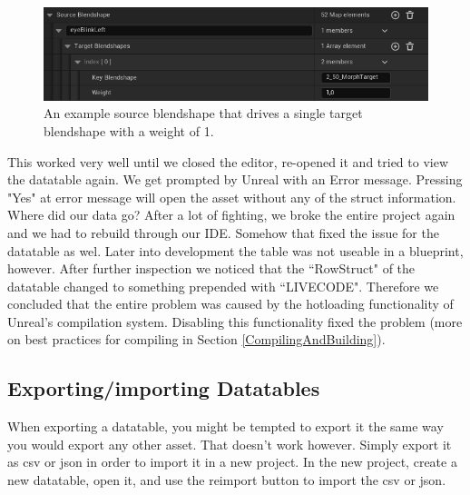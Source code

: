 \documentclass{uva-inf-article}
\begin{document}
\begin{figure}[hbt!]
    \centering
    \includegraphics[width=\textwidth]{imgs/singleBlendshapeData.png}
    \caption{An example source blendshape that drives a single target blendshape with a weight of 1.}
    \label{fig:blendshapeStructExample}
\end{figure}

This worked very well until we closed the editor, re-opened it and tried to view the datatable again. We get prompted by Unreal with an Error message. Pressing "Yes" at error message will open the asset without any of the struct information. Where did our data go? After a lot of fighting, we broke the entire project again and we had to rebuild through our IDE. Somehow that fixed the issue for the datatable as wel. Later into development the table was not useable in a blueprint, however. After further inspection we noticed that the ``RowStruct" of the datatable changed to something prepended with ``LIVECODE". Therefore we concluded that the entire problem was caused by the hotloading functionality of Unreal's compilation system. Disabling this functionality fixed the problem (more on best practices for compiling in Section \ref{CompilingAndBuilding}).

\subsection{Exporting/importing Datatables}
When exporting a datatable, you might be tempted to export it the same way you would export any other asset. That doesn't work however. Simply export it as csv or json in order to import it in a new project. In the new project, create a new datatable, open it, and use the reimport button to import the csv or json.


\printbibliography



\end{document}
